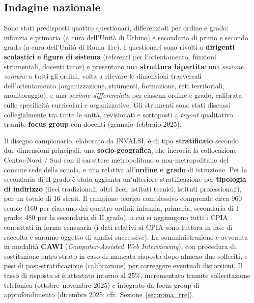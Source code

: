\documentclass[12pt,a4paper]{article}
\begin{document}
\subsection{Indagine nazionale}
\label{sec:indagine}

Sono stati predisposti quattro questionari, differenziati per ordine e grado: infanzia e primaria (a cura dell'Unit\`a di Urbino) e secondaria di primo e secondo grado (a cura dell'Unit\`a di Roma Tre). I questionari sono rivolti a \textbf{dirigenti scolastici e figure di sistema} (referenti per l'orientamento, funzioni strumentali, docenti tutor) e presentano una \textbf{struttura bipartita}: una \textit{sezione comune} a tutti gli ordini, volta a rilevare le dimensioni trasversali dell'orientamento (organizzazione, strumenti, formazione, reti territoriali, monitoraggio), e una \textit{sezione differenziata} per ciascun ordine e grado, calibrata sulle specificit\`a curricolari e organizzative. Gli strumenti sono stati discussi collegialmente tra tutte le unit\`a, revisionati e sottoposti a \textit{tryout} qualitativo tramite \textbf{focus group} con docenti (gennaio--febbraio 2025).

Il disegno campionario, elaborato da INVALSI, \`e di tipo \textbf{stratificato} secondo due dimensioni principali: una \textbf{socio-geografica}, che incrocia la collocazione Centro-Nord / Sud con il carattere metropolitano o non-metropolitano del comune sede della scuola, e una relativa all'\textbf{ordine e grado} di istruzione. Per la secondaria di II grado \`e stata aggiunta un'ulteriore stratificazione per \textbf{tipologia di indirizzo} (licei tradizionali, altri licei, istituti tecnici, istituti professionali), per un totale di 16 strati. Il campione teorico complessivo comprende circa 960 scuole (160 per ciascuno dei quattro ordini: infanzia, primaria, secondaria di I grado; 480 per la secondaria di II grado), a cui si aggiungono tutti i CPIA contattati in forma censuaria (i dati relativi ai CPIA sono tuttora in fase di raccolta e saranno oggetto di analisi successive). La somministrazione \`e avvenuta in modalit\`a \textbf{CAWI} (\textit{Computer-Assisted Web Interviewing}), con procedura di sostituzione entro strato in caso di mancata risposta dopo almeno due solleciti, e pesi di post-stratificazione (calibrazione) per correggere eventuali distorsioni. Il tasso di risposta si \`e attestato intorno al 25\%, incrementato tramite sollecitazione telefonica (ottobre--novembre 2025) e integrato da focus group di approfondimento (dicembre 2025; cfr.\ Sezione~\ref{sec:roma_tre}).
\end{document}
